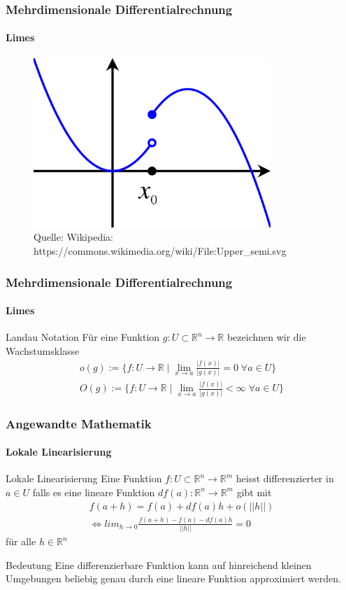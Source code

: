 \documentclass{beamer}
\begin{document}
\begin{frame}
    \frametitle{Mehrdimensionale Differentialrechnung}
\framesubtitle{Limes}

\begin{figure}[H]
      \centering
    \includegraphics[width=0.8\textwidth]{images/500px-Upper_semi}
      \caption{Quelle: Wikipedia: https://commons.wikimedia.org/wiki/File:Upper\_semi.svg}
\end{figure}

 \end{frame}

\begin{frame}
    \frametitle{Mehrdimensionale Differentialrechnung}
\framesubtitle{Limes}
    \begin{block}{Landau Notation}
Für eine Funktion $g : U \subset \mathbb{R}^n \to \mathbb{R}$ bezeichnen wir die Wachstumsklasse 
\begin{align*}
o(g) := \{ f : U  \to \mathbb{R} \; | \; \lim_{x \to a} \frac {|f(x)|}{|g(x)|} = 0 \; \forall a \in U \} \\
O(g) := \{ f : U  \to \mathbb{R} \; | \; \lim_{x \to a} \frac {|f(x)|}{|g(x)|} < \infty \; \forall a \in U \}
\end{align*}
\end{block}
 \end{frame}


\begin{frame}
    \frametitle{Angewandte Mathematik}
\framesubtitle{Lokale Linearisierung}
    \begin{block}{Lokale Linearisierung}
Eine Funktion  $f: U \subset \mathbb{R}^n \to \mathbb{R}^m$ heisst differenzierter  in $a \in U$ falls es eine lineare Funktion 
$df(a):  \mathbb{R}^n \to  \mathbb{R}^m$ gibt mit
\begin{align}
\label{diff}
f(a + h)  =  f(a)  +  df(a) h + o(||h||)  \\
\Leftrightarrow lim_{h \to 0} \frac{f(a + h)  -  f(a)  -  df(a)h}{||h||} = 0
\end{align}
für alle $h \in \mathbb{R}^n$
\end{block}
    \begin{block}{Bedeutung}
Eine differenzierbare Funktion kann  auf hinreichend kleinen Umgebungen 
beliebig genau durch eine lineare Funktion approximiert werden. 
\end{block}
 \end{frame}
\end{document}
